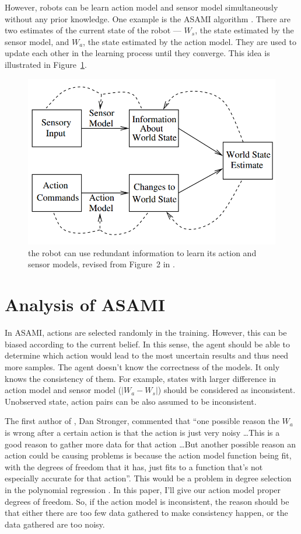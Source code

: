 \documentclass[10pt]{article}
\begin{document}
However, robots can be learn action model and sensor model
simultaneously without any prior knowledge. One example is the ASAMI
algorithm \cite{CSJ06}. There are two estimates of the current state
of the robot --- $W_s$, the state estimated by the sensor model, and
$W_a$, the state estimated by the action model. They are used to
update each other in the learning process until they converge. This
idea is illustrated in Figure~\ref{fig:relation}.

\begin{figure}
\centering
\includegraphics[width=0.7\columnwidth]{relation.png}
\caption{the robot can use redundant information to learn its action
and sensor models, revised from Figure~2 in \cite{CSJ06}.}
\label{fig:relation}
\end{figure}

\section{Analysis of ASAMI}

In ASAMI, actions are selected randomly
in the training. However, this can be biased according to the current
belief.  In this sense, the agent should be able to determine which
action would lead to the most uncertain results and thus need more
samples.  The agent doesn't know the correctness of the models. It
only knows the consistency of them. For example, states with larger
difference in action model and sensor model ($|W_a - W_s|$) should be
considered as inconsistent.  Unobserved state, action pairs can be
also assumed to be inconsistent.

The first author of \cite{CSJ06}, Dan Stronger, commented that ``one
possible reason the $W_a$ is wrong after a certain action is that the
action is just very noisy \ldots This is a good reason to gather more
data for that action \ldots  But another possible reason  an action
could be causing problems is because the action model function being
fit, with the degrees of freedom that it has, just fits to a function
that's not especially accurate for that action''. This would be a
problem in degree selection in the polynomial regression
\cite{IJAIT08-stronger}. In this paper, I'll give our action model
proper degrees of freedom. So, if the action model is inconsistent,
the reason should be that either there are too few data gathered to
make consistency happen, or the data gathered are too noisy.
\end{document}
